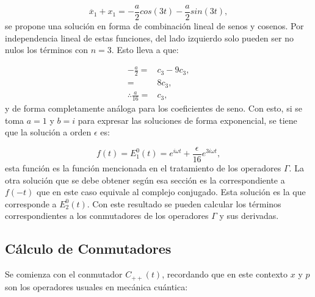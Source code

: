 \documentclass[a4paper,10pt]{report}
\begin{document}
\begin{equation}
\ddot{x_1} + x_1 = -\frac{a}{2}cos(3t)-\frac{a}{2}sin(3t),
\end{equation} se propone una solución en forma de combinación lineal de senos y cosenos. Por independencia lineal de estas funciones, del lado izquierdo solo pueden ser no nulos los términos con $n=3$. Esto lleva a que:

\begin{align*}
-\frac{a}{2} =& c_3 - 9c_3, \\
=& 8c_3, \\
\therefore \frac{a}{16} =& c_3,
\end{align*} y de forma completamente análoga para los coeficientes de seno. Con esto, si se toma $a=1$ y $b=i$ para expresar las soluciones de forma exponencial, se tiene que la solución a orden $\epsilon$ es:


\begin{equation}
f(t)= E_1^0(t) = e^{i\omega t} + \frac{\epsilon}{16} e^{3i\omega t},
\end{equation} esta función es la función mencionada en el tratamiento de los operadores $\Gamma$. La otra solución que se debe obtener según esa sección es la correspondiente a $f(-t)$ que en este caso equivale al complejo conjugado. Esta solución es la que corresponde a $E_2^0(t)$. Con este resultado se pueden calcular los términos correspondientes a los conmutadores de los operadores $\Gamma$ y sus derivadas.

\subsection{Cálculo de Conmutadores}

Se comienza con el conmutador $C_{++}(t)$, recordando que en este contexto $x$ y $p$ son los operadores usuales en mecánica cuántica:
\end{document}
